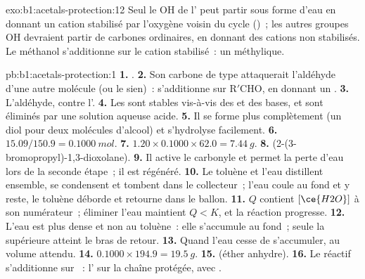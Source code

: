 \begin{solution}{exo:b1:acetals-protection:12}
Seul le OH de l' peut partir sous forme d'eau en donnant un
cation stabilisé par l'oxygène voisin du cycle ()~; les autres
groupes OH devraient partir de carbones ordinaires, en donnant des
cations non stabilisés. Le méthanol s'additionne sur le cation stabilisé~:
un  méthylique.
\end{solution}

\begin{solution}{pb:b1:acetals-protection:1}
\textbf{1.} .
\textbf{2.} Son carbone de type  attaquerait l'aldéhyde d'une
autre molécule (ou le sien)~:  s'additionne sur
$\mathrm{R'CHO}$, en donnant un .
\textbf{3.} L'aldéhyde, contre l'.
\textbf{4.} Les  sont stables vis-à-vis des  et
des bases, et sont éliminés par une solution aqueuse acide.
\textbf{5.} Il se forme plus complètement (un diol pour deux molécules
d'alcool) et s'hydrolyse facilement.
\textbf{6.} $15.09/150.9 = \qty{0.1000}{mol}$.
\textbf{7.} $1.20 \times 0.1000 \times 62.0 = \qty{7.44}{g}$.
\textbf{8.} 
(2-(3-bromopropyl)-1,3-dioxolane).
\textbf{9.} Il active le carbonyle et permet la perte d'eau lors de la
seconde étape~; il est régénéré.
\textbf{10.} Le toluène et l'eau distillent ensemble, se condensent et
tombent dans le collecteur~; l'eau coule au fond et y reste, le toluène
déborde et retourne dans le ballon.
\textbf{11.} $Q$ contient $[\ce{H2O}]$ à son numérateur~; éliminer l'eau
maintient $Q < K$, et la réaction progresse.
\textbf{12.} L'eau est plus dense et non  au toluène~: elle
s'accumule au fond~; seule la  supérieure atteint le bras de retour.
\textbf{13.} Quand l'eau cesse de s'accumuler, au volume attendu.
\textbf{14.} $0.1000 \times 194.9 = \qty{19.5}{g}$.
\textbf{15.}  (éther anhydre).
\textbf{16.} Le réactif s'additionne sur ~: l'
 sur la chaîne protégée, avec .

\end{solution}

